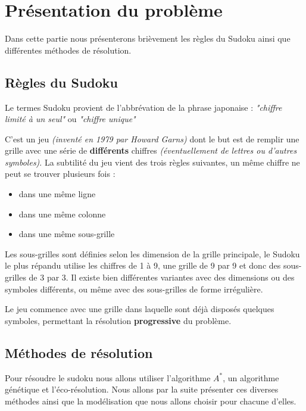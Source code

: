\chapter{Présentation du problème}
  
Dans cette partie nous présenterons brièvement les règles du Sudoku ainsi que différentes méthodes de résolution.


\section{Règles du Sudoku}

Le termes Sudoku provient de l'abbrévation de la phrase japonaise : \textit{"chiffre limité à un seul"} ou \textit{"chiffre unique"}

C'est un jeu \textit{(inventé en 1979 par Howard Garns)} dont le but est de remplir une grille avec une série de \textbf{différents} chiffres \textit{(éventuellement de lettres ou d'autres symboles)}. La subtilité du jeu vient des trois règles suivantes, un même chiffre ne peut se trouver plusieurs fois :

\begin{itemize}

\item dans une même ligne
\item dans une même colonne
\item dans une même sous-grille

\end{itemize}

Les sous-grilles sont définies selon les dimension de la grille principale, le Sudoku le plus répandu utilise les chiffres de 1 à 9, une grille de 9 par 9 et donc des sous-grilles de 3 par 3. Il existe bien différentes variantes avec des dimensions ou des symboles différents, ou même avec des sous-grilles de forme irrégulière.

Le jeu commence avec une grille dans laquelle sont déjà disposés quelques symboles, permettant la résolution \textbf{progressive} du problème.


\section{Méthodes de résolution}

Pour résoudre le sudoku nous allons utiliser l'algorithme $A^*$, un algorithme génétique et l'éco-résolution. Nous allons par la suite présenter ces diverses méthodes ainsi que la modélisation que nous allons choisir pour chacune d'elles. 
